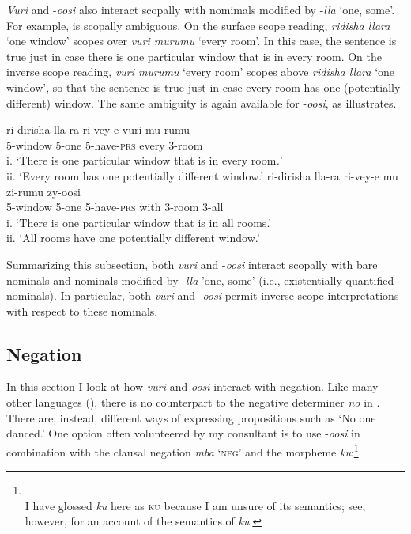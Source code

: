 \documentclass[output=paper]{langsci/langscibook}
\begin{document}
\textit{Vuri} and -\textit{oosi} also interact scopally with nomimals modified by -\textit{lla} ‘one, some’. For example,  is scopally ambiguous. On the surface scope reading, \textit{ridisha llara} ‘one window’ scopes over \textit{vuri murumu} ‘every room’. In this case, the sentence is true just in case there is one particular window that is in every room. On the inverse scope reading, \textit{vuri murumu} ‘every room’ scopes above \textit{ridisha llara} ‘one window’, so that the sentence is true just in case every room has one (potentially different) window. The same ambiguity is again available for -\textit{oosi}, as  illustrates.

\ea\label{ex:landman:27} 
\ea\label{ex:landman:27a}
\gll ri-dirisha     lla-ra  ri-vey-e  vuri  mu-rumu  \\
     5-window   5-one  5-have-\textsc{prs}  every  3-room\\
\glt i. ‘There is one particular window that is in every room\textit{.}’  \\
ii. ‘Every room has one potentially different window.’        
\ex\label{ex:landman:27b}
\gll ri-dirisha   lla-ra   ri-vey-e         mu     zi-rumu  zy-oosi\\
     5-window  5-one   5-have-\textsc{prs}    with   3-room  3-all\\
\glt i. ‘There is one particular window that is in all rooms.’ \\
ii. ‘All rooms have one potentially different window.’    \textsc{}  
\z
\z

Summarizing this subsection, both \textit{vuri} and -\textit{oosi} interact scopally with bare nominals and nominals modified by -\textit{lla} 'one, some' (i.e., existentially quantified nominals). In particular, both \textit{vuri} and -\textit{oosi} permit inverse scope interpretations with respect to these nominals.

\subsection{Negation}\label{sec:landman:4.2}

In this section I look at how \textit{vuri} and-\textit{oosi} interact with negation. Like many other  languages (\citealt{ZerbianKrifka2008}), there is no counterpart to the negative  determiner \textit{no} in . There are, instead, different ways of expressing propositions such as ‘No one danced.’ One option often volunteered by my consultant is to use -\textit{oosi} in combination with the clausal negation \textit{mba} ‘\textsc{neg}’ and the morpheme \textit{ku}:\footnote{\\
 I have glossed \textit{ku} here as \textsc{ku} because I am unsure of its semantics; see, however, \citet{BowlerGluckman2015} for an account of the semantics of \textit{ku}.}
\end{document}
